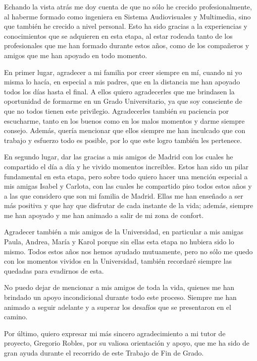 \documentclass[a4paper, 12pt]{book}
\begin{document}
Echando la vista atrás me doy cuenta de que no sólo he crecido profesionalmente, al haberme formado como ingeniera en Sistema Audiovisuales y Multimedia, sino que también he crecido a nivel personal.
Esto ha sido gracias a la experiencias y conocimientos que se adquieren en esta etapa, al estar rodeada tanto de los profesionales que me han formado durante estos años, como de los compañeros y amigos que me han apoyado en todo momento.


En primer lugar, agradecer a mi familia por creer siempre en mí, cuando ni yo misma lo hacía, en especial a mis padres, que en la distancia me han apoyado todos los días hasta el final.
A ellos quiero agradecerles que me brindasen la oportunidad de formarme en un Grado Universitario, ya que soy consciente de que no todos tienen este privilegio.
Agradecerles también su paciencia por escucharme, tanto en los buenos como en los malos momentos y darme siempre consejo.
Además, quería mencionar que ellos siempre me han inculcado que con trabajo y esfuerzo todo es posible, por lo que este logro también les pertenece.


En segundo lugar, dar las gracias a mis amigos de Madrid con los cuales he compartido el día a día y he vivido momentos increibles. 
Estos han sido un pilar fundamental en esta etapa, pero sobre todo quiero hacer una mención especial a mis amigas Isabel y Carlota, con las cuales he compartido piso todos estos años y a las que considero que son mi familia de Madrid.
Ellas me han enseñado a ser más positiva y que hay que disfrutar de cada instante de la vida; además, siempre me han apoyado y me han animado a salir de mi zona de confort.  


Agradecer también a mis amigos de la Universidad, en particular a mis amigas Paula, Andrea, María y Karol porque sin ellas esta etapa no hubiera sido lo mismo. 
Todos estos años nos hemos ayudado mutuamente, pero no sólo me quedo con los momentos vividos en la Universidad, también recordaré siempre las quedadas para evadirnos de esta. 


No puedo dejar de mencionar a mis amigos de toda la vida, quienes me han brindado un apoyo incondicional durante todo este proceso. 
Siempre me han animado a seguir adelante y a superar los desafíos que se presentaron en el camino.


Por último, quiero expresar mi más sincero agradecimiento a mi tutor de proyecto, Gregorio Robles, por su valiosa orientación y apoyo, que me ha sido de gran ayuda durante el recorrido de este Trabajo de Fin de Grado. 
\end{document}
